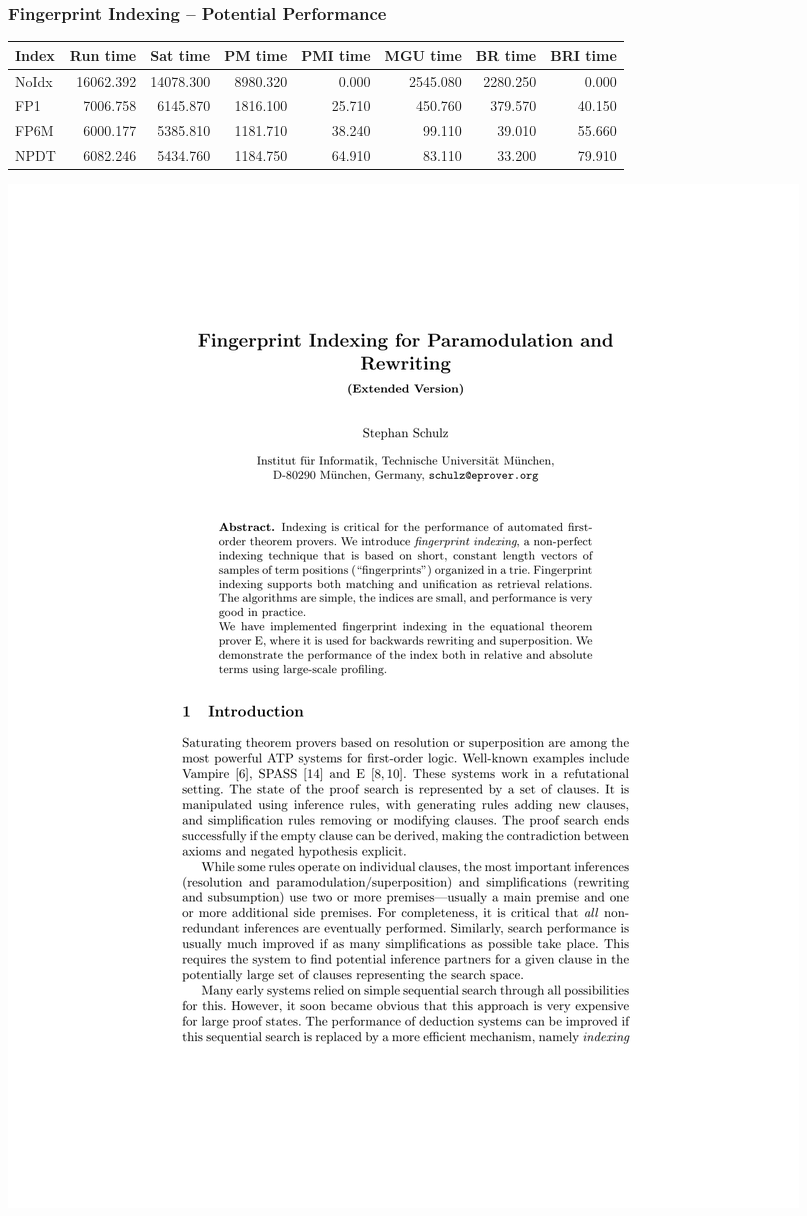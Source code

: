 \documentclass[10pt]{beamer}
\begin{document}
\begin{NoHyper}
  \begin{frame}
  \frametitle{Fingerprint Indexing -- Potential Performance}
  \begin{center}{\tiny
  \begin{tabular}{| l | r | r | r | r | r | r | r |} \hline
  Index & Run time & Sat time & PM time & PMI time & MGU time & BR time & BRI time \\ \hline
NoIdx & 16062.392 & 14078.300 &  8980.320 & 0.000 & 2545.080  & 2280.250 & 0.000\\
FP1 & 7006.758 & 6145.870 & 1816.100 & 25.710 & 450.760 & 379.570 & 40.150\\
FP6M & 6000.177 & 5385.810 & 1181.710 & 38.240 & 99.110 & 39.010 & 55.660\\
NPDT & 6082.246 & 5434.760 & 1184.750 & 64.910 & 83.110 & 33.200 & 79.910 \\\hline
  \end{tabular}}\vspace{0.5cm}
  \includegraphics[page=13,scale=0.5,trim=6cm 8cm 7cm 12cm,clip]{schulz_fp-index_ext}

\end{center}
\end{frame}
\end{NoHyper}
\end{document}
